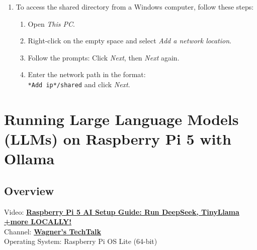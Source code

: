 \documentclass[a4paper,12pt]{article}
\begin{document}
\begin{enumerate}
    \item To access the shared directory from a Windows computer, follow these steps:
     \begin{enumerate}
        \item Open \textit{This PC}.
        \item Right-click on the empty space and select \textit{Add a network location}.
        \item Follow the prompts: Click \textit{Next}, then \textit{Next} again.
        \item Enter the network path in the format: \texttt{\\*Add ip*/shared} and click \textit{Next}.
      \end{enumerate}

\end{enumerate}

\section{Running Large Language Models (LLMs) on Raspberry Pi 5 with Ollama}

\subsection{Overview}
Video: \href{https://www.youtube.com/watch?v=nNxtQhz1b2M}{\textbf{\color{blue}Raspberry Pi 5 AI Setup Guide: Run DeepSeek, TinyLlama +more LOCALLY!}} \\
Channel: \href{https://www.youtube.com/@WagnersTechTalk}{\textbf{\color{blue}Wagner's TechTalk}} \\
Operating System: Raspberry Pi OS Lite (64-bit)
\end{document}
